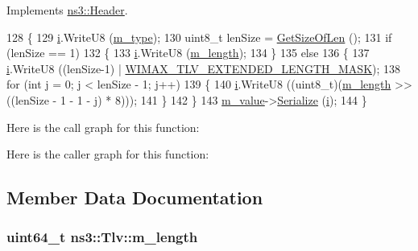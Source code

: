 Implements \hyperlink{classns3_1_1Header_afb61f1aac69ff8349a6bfe521fab5404}{ns3\+::\+Header}.


\begin{DoxyCode}
128 \{
129   \hyperlink{bernuolliDistribution_8m_a6f6ccfcf58b31cb6412107d9d5281426}{i}.WriteU8 (\hyperlink{classns3_1_1Tlv_a16281bcabeafd34ba3a0f70823295ff2}{m\_type});
130   uint8\_t lenSize = \hyperlink{classns3_1_1Tlv_a1dfbebef6a6e426351d38fe019254413}{GetSizeOfLen} ();
131   \textcolor{keywordflow}{if} (lenSize == 1)
132     \{
133       \hyperlink{bernuolliDistribution_8m_a6f6ccfcf58b31cb6412107d9d5281426}{i}.WriteU8 (\hyperlink{classns3_1_1Tlv_a283be5043bd1d6accea0fb54b27824ce}{m\_length});
134     \}
135   \textcolor{keywordflow}{else}
136     \{
137       \hyperlink{bernuolliDistribution_8m_a6f6ccfcf58b31cb6412107d9d5281426}{i}.WriteU8 ((lenSize-1) | \hyperlink{wimax-tlv_8h_a590060b4cac40c59bb72398847174fae}{WIMAX\_TLV\_EXTENDED\_LENGTH\_MASK});
138       \textcolor{keywordflow}{for} (\textcolor{keywordtype}{int} j = 0; j < lenSize - 1; j++)
139         \{
140           \hyperlink{bernuolliDistribution_8m_a6f6ccfcf58b31cb6412107d9d5281426}{i}.WriteU8 ((uint8\_t)(\hyperlink{classns3_1_1Tlv_a283be5043bd1d6accea0fb54b27824ce}{m\_length} >> ((lenSize - 1 - 1 - j) * 8)));
141         \}
142     \}
143   \hyperlink{classns3_1_1Tlv_add00ad86b735ae058202b756bdc1d15c}{m\_value}->\hyperlink{classns3_1_1TlvValue_aeec8825728398e18337efd9cb40a2aa4}{Serialize} (\hyperlink{bernuolliDistribution_8m_a6f6ccfcf58b31cb6412107d9d5281426}{i});
144 \}
\end{DoxyCode}


Here is the call graph for this function\+:




Here is the caller graph for this function\+:




\subsection{Member Data Documentation}
\subsubsection[{\texorpdfstring{m\+\_\+length}{m_length}}]{\setlength{\rightskip}{0pt plus 5cm}uint64\+\_\+t ns3\+::\+Tlv\+::m\+\_\+length\hspace{0.3cm}{\ttfamily [private]}}\hypertarget{classns3_1_1Tlv_a283be5043bd1d6accea0fb54b27824ce}{}\label{classns3_1_1Tlv_a283be5043bd1d6accea0fb54b27824ce}


